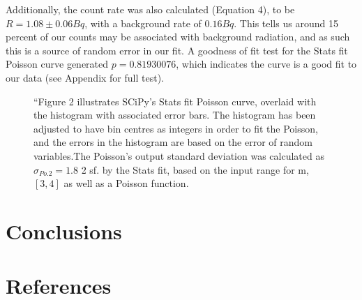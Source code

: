 \documentclass[11pt]{article}
\begin{document}
Additionally, the count rate was also calculated (Equation 4), to be $R = 1.08 \pm 0.06  Bq$, with a background rate of $0.16 Bq$. This tells us around 15 percent of our counts may be associated with background radiation, and as such this is a source of random error in our fit.
A goodness of fit test for the Stats fit Poisson curve generated $p = 0.81930076$, which indicates the curve is a good fit to our data (see Appendix for full test). 
    
  
       \begin{figure}[]
        \begin{center}
            \def\svgwidth{\columnwidth}
            
             \caption{“Figure 2 illustrates SCiPy's Stats fit Poisson curve, overlaid with the histogram with associated error bars. The histogram has been adjusted to have bin centres as integers in order to fit the Poisson, and the errors in the histogram are based on the error of random variables.The Poisson's output standard deviation was calculated as $\sigma_{Po.2} = 1.8$ 2 sf. by the Stats fit,  based on the input range for m, $[3,4]$ as well as a Poisson function.}
             \label{fig:experimental results 2}
        \end{center}
    \end{figure}
    \section{Conclusions}
    \section{References}
\end{document}
